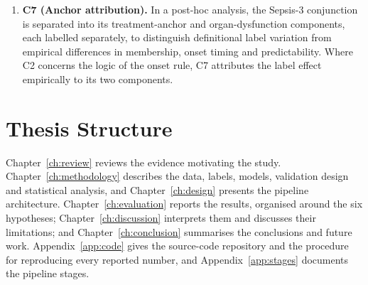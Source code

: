\begin{enumerate}
    \item \textbf{C7 (Anchor attribution).} In a post-hoc analysis, the
    Sepsis-3 conjunction is separated into its treatment-anchor and
    organ-dysfunction components, each labelled separately, to distinguish
    definitional label variation from empirical differences in membership,
    onset timing and predictability. Where C2 concerns the logic of the onset
    rule, C7 attributes the label effect empirically to its two components.
\end{enumerate}


\section{Thesis Structure}

Chapter~\ref{ch:review} reviews the evidence motivating the study.
Chapter~\ref{ch:methodology} describes the data, labels, models, validation
design and statistical analysis, and Chapter~\ref{ch:design} presents the
pipeline architecture. Chapter~\ref{ch:evaluation} reports the results,
organised around the six hypotheses; Chapter~\ref{ch:discussion} interprets
them and discusses their limitations; and Chapter~\ref{ch:conclusion}
summarises the conclusions and future work. Appendix~\ref{app:code} gives the
source-code repository and the procedure for reproducing every reported
number, and Appendix~\ref{app:stages} documents the pipeline stages.
